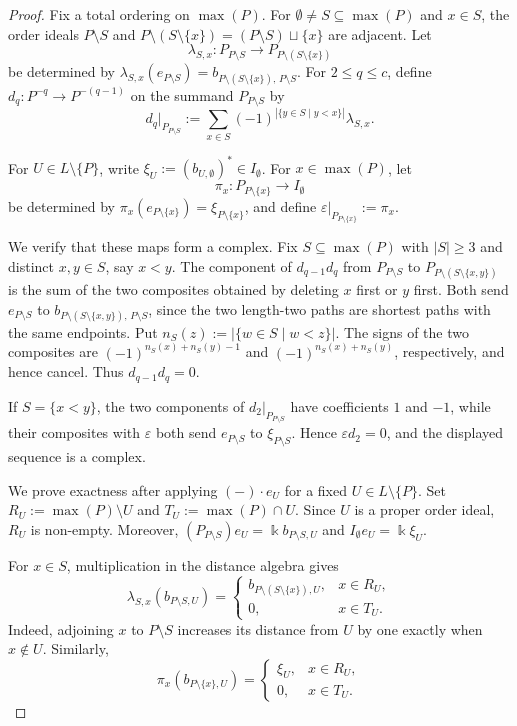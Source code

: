 \documentclass[a4paper,leqno]{amsart}
\begin{document}
\begin{proof}
Fix a total ordering on $\max(P)$.  For $\emptyset\neq S\subseteq\max(P)$ and $x\in S$, the order ideals $P\setminus S$ and $P\setminus(S\setminus\{x\})=(P\setminus S)\sqcup\{x\}$ are adjacent. Let
\[
\lambda_{S,x}:P_{P\setminus S}\longrightarrow
P_{P\setminus(S\setminus\{x\})}
\]
be determined by $\lambda_{S,x}(e_{P\setminus S})=b_{P\setminus(S\setminus\{x\}),\,P\setminus S}$.  For $2\leq q\leq c$, define
$d_q:P^{-q}\to P^{-(q-1)}$
on the summand $P_{P\setminus S}$ by
\[
d_q|_{P_{P\setminus S}}
:=\sum_{x\in S}
(-1)^{|\{y\in S\mid y<x\}|}\lambda_{S,x}.
\]

For $U\in L\setminus\{P\}$, write $\xi_U:=(b_{U,\emptyset})^*\in I_{\emptyset}$.  For $x\in\max(P)$, let
\[
\pi_x:P_{P\setminus\{x\}}\longrightarrow I_{\emptyset}
\]
be determined by $\pi_x(e_{P\setminus\{x\}})=\xi_{P\setminus\{x\}}$, and define $\varepsilon|_{P_{P\setminus\{x\}}}:=\pi_x$.

We verify that these maps form a complex.  Fix $S\subseteq\max(P)$ with $|S|\geq3$ and distinct $x,y\in S$, say $x<y$.  The component of $d_{q-1}d_q$ from $P_{P\setminus S}$ to $P_{P\setminus(S\setminus\{x,y\})}$ is the sum of the two composites obtained by deleting $x$ first or $y$ first.  Both send
$e_{P\setminus S}$ to $b_{P\setminus(S\setminus\{x,y\}),\,P\setminus S}$, since the two length-two paths are shortest paths with the same endpoints.  Put $n_S(z):=|\{w\in S\mid w<z\}|$.  The signs of the two composites are
$(-1)^{n_S(x)+n_S(y)-1}$ and $(-1)^{n_S(x)+n_S(y)}$, respectively, and hence cancel.  Thus $d_{q-1}d_q=0$.

If $S=\{x<y\}$, the two components of $d_2|_{P_{P\setminus S}}$ have coefficients $1$ and $-1$, while their composites with $\varepsilon$ both send $e_{P\setminus S}$ to $\xi_{P\setminus S}$.  Hence $\varepsilon d_2=0$, and the displayed sequence is a complex.

We prove exactness after applying $(-)\cdot e_U$ for a fixed $U\in L\setminus\{P\}$.  Set $R_U:=\max(P)\setminus U$ and $T_U:=\max(P)\cap U$.  Since $U$ is a
proper order ideal, $R_U$ is non-empty.  Moreover, $(P_{P\setminus S})e_U=\Bbbk b_{P\setminus S,U}$ and $I_{\emptyset}e_U=\Bbbk\xi_U$.

For $x\in S$, multiplication in the distance algebra gives
\[
\lambda_{S,x}(b_{P\setminus S,U})
=\begin{cases}
b_{P\setminus(S\setminus\{x\}),U},&x\in R_U,\\
0,&x\in T_U.
\end{cases}
\]
Indeed, adjoining $x$ to $P\setminus S$ increases its distance from
$U$ by one exactly when $x\notin U$.  Similarly,
\[
\pi_x(b_{P\setminus\{x\},U})
=\begin{cases}
\xi_U,&x\in R_U,\\
0,&x\in T_U.
\end{cases}
\]


\end{proof}
\end{document}
